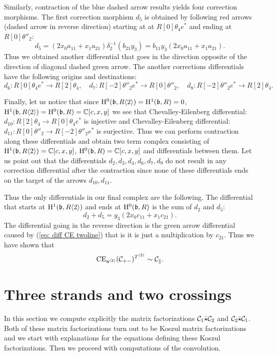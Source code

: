 Similarly, contraction of the blue dashed arrow results yields four correction morphisms. The first correction morphism $d_5$ is obtained by following red arrows (dashed arrow in reverse direction) starting at at $R[0]\theta_4 e^*$ and ending at $R[0]\theta''_2$:
$$d_5=(2x_0a_{11}+x_1a_{21})\delta_2^{-1}(b_{21}y_3)=b_{11}y_3(2x_0a_{11}+x_1a_{21}).$$
Thus we obtained another differential that goes in the direction opposite of the direction of diagonal dashed green arrow.
The another corrections differentials have the following origins and destinations:
$$d_6: R[0]\theta_4e^*\to R[2]\theta_4,\quad d_7: R[-2]\theta''_2e^*\to R[0]\theta''_2,\quad d_8: R[-2]\theta''_2e^*\to R[2]\theta_4.$$

Finally, let us notice that since $\mathrm{H}^{0}(\mathfrak{b},R\langle 2\rangle)=\mathrm{H}^{1}(\mathfrak{b},R)=0$,   $\mathrm{H}^{1}(\mathfrak{b},R\langle 2\rangle)=\mathrm{H}^{0}(\mathfrak{b},R)=\mathbb{C}[c,x,y]$ we see that Chevalley-Eilenberg differential: $d_{10}:R[2]\theta_4\to R[0]\theta_4 e^*$ is
injective and Chevalley-Eilenberg differential: $d_{11}:R[0]\theta''_2\to R[-2]\theta''_2 e^*$ is surjective. Thus we can perform contraction along these differentials and obtain two term complex consisting of   $\mathrm{H}^{1}(\mathfrak{b},R\langle 2\rangle)=\mathbb{C}[c,x,y]$,
$\mathrm{H}^{0}(\mathfrak{b},R)=\mathbb{C}[c,x,y]$ and differentials between them. Let us point out that the differentials $d_2,d_3,d_4,d_6,d_7,d_9$ do not result in any correction differential after the contraction since none of these differentials ends on the
target of the arrows $d_{10},d_{11}$.

Thus the only differentials in our final complex are the following. The differential that starts at $\mathrm{H}^{1}(\mathfrak{b},R\langle 2\rangle)$ and ends at $\mathrm{H}^{0}(\mathfrak{b},R)$ is the sum of $d_2$ and $d_5$:
$$d_2+d_5=y_3(2x_0c_{11}+x_1c_{21}).$$
The differential going in the reverse direction is the green arrow differential caused by (\ref{eq: diff CE twoline}) that is it is just a multiplication by $c_{21}$. Thus
we have shown that
$$\mathrm{CE}_{\mathfrak{n}^{(2)}}(\mathcal{C}_{+-})^{T^{(2)}}\sim \mathcal{C}_\parallel.$$



\section{Three strands and two crossings}\label{sec: three str 2}
In this section we compute explicitly the matrix factorizations $\mathcal{C}_1\bar{\star}\mathcal{C}_2$ and $\mathcal{C}_2\bar{\star}\mathcal{C}_1$. Both of these matrix factorizations
turn out to be Koszul matrix factorizations and we start with explanations for the equations defining these Koszul factorizations. Then we proceed with
computations of the convolution.

